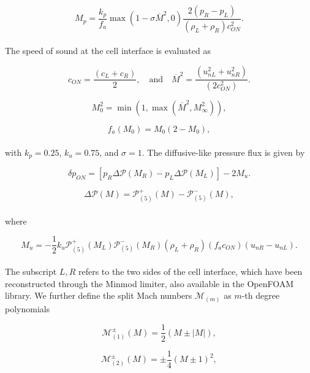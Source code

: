\documentclass[a5paper]{sapthesis}
\begin{document}
	\begin{equation}
		M_p = \frac{k_p}{f_a} \max \left( 1 - \sigma \overline{M}^2, 0 \right) \frac{2(p_R - p_L)}{(\rho_L + \rho_R) c_{ON}^2}.
	\end{equation}
	\\
	The speed of sound at the cell interface is evaluated as 
	
	\begin{equation}
		c_{ON} = \frac{(c_L + c_R)}{2}, \quad \text{and} \quad \overline{M}^2 = \frac{(u_{nL}^2 + u_{nR}^2)}{(2c_{ON}^2)}.
	\end{equation}
	
	\begin{equation}
		M_0^2 = \min(1, \max(\overline{M}^2, M_{\infty}^2)),
	\end{equation}
	
	\begin{equation}
		f_a (M_0) = M_0 (2 - M_0),
	\end{equation}
	\\
	with $ k_p = 0.25 $, $ k_u = 0.75 $, and $ \sigma = 1 $.
	The diffusive-like pressure flux is given by
	
	\begin{equation}
		\delta p_{ON} = \left[ p_R \Delta \mathcal{P}(M_R) - p_L \Delta \mathcal{P}(M_L) \right] - 2M_u.
	\end{equation}
	
	\begin{equation}
		\Delta \mathcal{P}(M) = \mathcal{P}_{(5)}^+ (M) - \mathcal{P}_{(5)}^- (M),
	\end{equation}
	\\
	where
	
	\begin{equation}
		M_u = -\frac{1}{2} k_u \mathcal{P}_{(5)}^+ (M_L) \mathcal{P}_{(5)}^- (M_R) (\rho_L + \rho_R) (f_a c_{ON}) (u_{nR} - u_{nL}).
	\end{equation}
	\\
	The subscript $L, R$ refers to the two sides of the cell interface, which have been reconstructed through the Minmod limiter, also available in the OpenFOAM library. We further define the split Mach numbers $\mathcal{M}_{(m)}$ as $m$-th degree polynomials
	
	\begin{equation}
		\mathcal{M}_{(1)}^{\pm} (M) = \frac{1}{2} (M \pm |M|),
	\end{equation}
	
	\begin{equation}
		\mathcal{M}_{(2)}^{\pm} (M) = \pm \frac{1}{4} (M \pm 1)^2,
	\end{equation}
	
\end{document}
